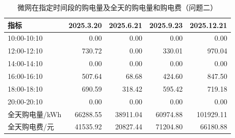 \begin{table}[H]
\centering
{}
\begin{tabular}{lrrrr}
\toprule
指标 & 2025.3.20 & 2025.6.21 & 2025.9.23 & 2025.12.21 \\
\midrule
10:00-10:10 & 0.00 & 0.00 & 0.00 & 0.00 \\
12:00-12:10 & 730.72 & 0.00 & 330.01 & 970.04 \\
14:00-14:10 & 0.00 & 0.00 & 0.00 & 0.00 \\
16:00-16:10 & 507.64 & 68.68 & 424.60 & 847.50 \\
18:00-18:10 & 690.59 & 318.42 & 595.42 & 719.18 \\
20:00-20:10 & 0.00 & 0.00 & 0.00 & 0.00 \\
\midrule
全天购电量/kWh & 66288.55 & 38911.04 & 60974.88 & 101929.11 \\
全天购电费/元 & 41535.92 & 20827.44 & 71204.80 & 66180.88 \\
\bottomrule
\end{tabular}
\caption{微网在指定时间段的购电量及全天的购电量和购电费（问题二）}
\label{tab:m1-q2}
\end{table}
\par{}
